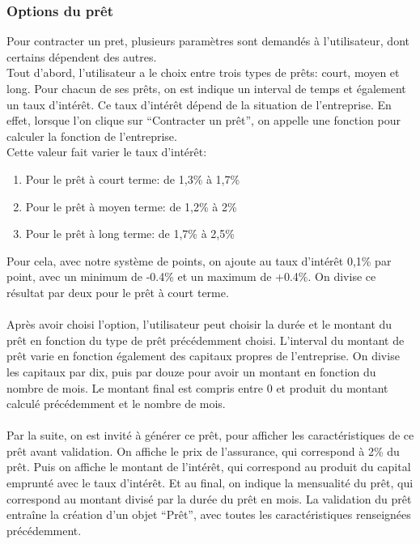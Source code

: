 \subsubsection{Options du prêt}
Pour contracter un pret, plusieurs paramètres sont demandés à l’utilisateur, dont certains dépendent des autres. \\
Tout d’abord, l’utilisateur a le choix entre trois types de prêts: court, moyen et long.
Pour chacun de ses prêts, on est indique un interval de temps et également un taux d'intérêt.
Ce taux d'intérêt dépend de la situation de l’entreprise. En effet, lorsque l’on clique sur “Contracter un prêt”, on appelle une fonction pour calculer la fonction de l’entreprise. \\
Cette valeur fait varier le taux d'intérêt:


\begin{enumerate}
\item Pour le prêt à court terme: de 1,3\% à 1,7\%
\item Pour le prêt à moyen terme: de 1,2\% à 2\%
\item Pour le prêt à long terme: de 1,7\% à 2,5\%
\end{enumerate}


Pour cela, avec notre système de points, on ajoute au taux d'intérêt 0,1\% par point, avec un minimum de -0.4\% et un maximum de +0.4\%. On divise ce résultat par deux pour le prêt à court terme. \\
\\
Après avoir choisi l’option, l’utilisateur peut choisir la durée et le montant du prêt en fonction du type de prêt précédemment choisi. L’interval du montant de prêt varie en fonction également des capitaux propres de l’entreprise. On divise les capitaux par dix, puis par douze pour avoir un montant en fonction du nombre de mois. Le montant final est compris entre 0 et produit du montant calculé précédemment et le nombre de mois.\\
\\
Par la suite, on est invité à générer ce prêt, pour afficher les caractéristiques de ce prêt avant validation. On affiche le prix de l’assurance, qui correspond à 2\% du prêt.
Puis on affiche le montant de l'intérêt, qui correspond au produit du capital emprunté avec le taux d'intérêt.
Et au final, on indique la mensualité du prêt, qui correspond au montant divisé par la durée du prêt en mois.
La validation du prêt entraîne la création d’un objet “Prêt”, avec toutes les caractéristiques renseignées précédemment.



